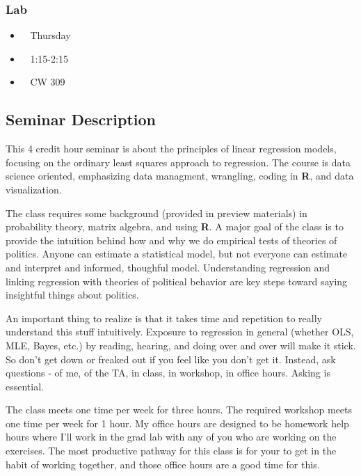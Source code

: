 \documentclass[
  letterpaper,
  DIV=11,
  numbers=noendperiod]{scrartcl}
\providecommand{\tightlist}{%
  \setlength{\itemsep}{0pt}\setlength{\parskip}{0pt}}\usepackage{longtable,booktabs,array}
\begin{document}
\hypertarget{lab}{%
\subsubsection{Lab}\label{lab}}

\begin{itemize}
\tightlist
\item
   ~ Thursday
\item
   ~ 1:15-2:15
\item
   ~ CW 309
\end{itemize}

\hypertarget{seminar-description}{%
\subsection{Seminar Description}\label{seminar-description}}

This 4 credit hour seminar is about the principles of linear regression
models, focusing on the ordinary least squares approach to regression.
The course is data science oriented, emphasizing data managment,
wrangling, coding in \textbf{R}, and data visualization.

The class requires some background (provided in preview materials) in
probability theory, matrix algebra, and using \textbf{R}. A major goal
of the class is to provide the intuition behind how and why we do
empirical tests of theories of politics. Anyone can estimate a
statistical model, but not everyone can estimate and interpret and
informed, thoughful model. Understanding regression and linking
regression with theories of political behavior are key steps toward
saying insightful things about politics.

An important thing to realize is that it takes time and repetition to
really understand this stuff intuitively. Exposure to regression in
general (whether OLS, MLE, Bayes, etc.) by reading, hearing, and doing
over and over will make it stick. So don't get down or freaked out if
you feel like you don't get it. Instead, ask questions - of me, of the
TA, in class, in workshop, in office hours. Asking is essential.

The class meets one time per week for three hours. The required workshop
meets one time per week for 1 hour. My office hours are designed to be
homework help hours where I'll work in the grad lab with any of you who
are working on the exercises. The most productive pathway for this class
is for your to get in the habit of working together, and those office
hours are a good time for this.
\end{document}
